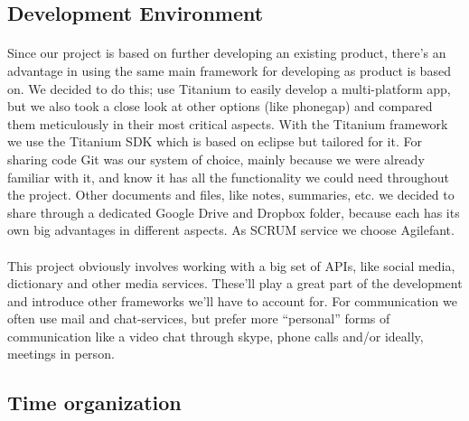 \documentclass[12pt,a4paper,titlepage]{article}
\begin{document}
			\subsection{Development Environment}
				\paragraph{}
Since our project is based on further developing an existing product, there’s an advantage in using the same main framework for developing as product is based on. We decided to do this; use Titanium to easily develop a multi-platform app, but we also took a close look at other options (like phonegap) and compared them meticulously in their most critical aspects. With the Titanium framework we use the Titanium SDK which is based on eclipse but tailored for it. For sharing code Git was our system of choice, mainly because we were already familiar with it, and know it has all the functionality we could need throughout the project. Other documents and files, like notes, summaries, etc. we decided to share through a dedicated Google Drive and Dropbox folder, because each has its own big advantages in different aspects. As SCRUM service we choose Agilefant.
				\paragraph{}
This project obviously involves working with a big set of APIs, like social media, dictionary and other media services. These’ll play a great part of the development and introduce other frameworks we’ll have to account for. For communication we often use mail and chat-services, but prefer more “personal” forms of communication like a video chat through skype, phone calls and/or ideally, meetings in person.
			\subsection{Time organization}
\end{document}

